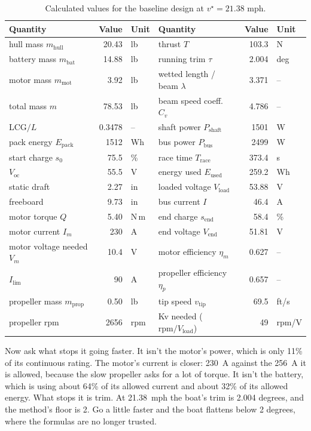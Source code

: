 \documentclass[11pt,a4paper]{article}
\renewcommand{\_}{\textunderscore\allowbreak}
\newcommand{\Trace}{T_{\mathrm{race}}}
\newcommand{\Pshaft}{P_{\mathrm{shaft}}}
\newcommand{\Pbus}{P_{\mathrm{bus}}}
\newcommand{\Eused}{E_{\mathrm{used}}}
\newcommand{\Epack}{E_{\mathrm{pack}}}
\newcommand{\Voc}{V_{\mathrm{oc}}}
\newcommand{\Vload}{V_{\mathrm{load}}}
\newcommand{\Vend}{V_{\mathrm{end}}}
\newcommand{\lcg}{\mathrm{LCG}}
\begin{document}
\begin{table}[H]
\centering\small
\caption{Calculated values for the baseline design at $v^\star=21.38$ mph.}
\begin{tabular}{@{}l r l @{\qquad} l r l@{}}
\toprule
Quantity & Value & Unit & Quantity & Value & Unit \\
\midrule
hull mass $m_{\mathrm{hull}}$ & 20.43 & lb & thrust $T$ & 103.3 & N \\
battery mass $m_{\mathrm{bat}}$ & 14.88 & lb & running trim $\tau$ & 2.004 & deg \\
motor mass $m_{\mathrm{mot}}$ & 3.92 & lb & wetted length / beam $\lambda$ & 3.371 & -- \\
total mass $m$ & 78.53 & lb & beam speed coeff.\ $C_v$ & 4.786 & -- \\
$\lcg/L$ & 0.3478 & -- & shaft power $\Pshaft$ & 1501 & W \\
pack energy $\Epack$ & 1512 & Wh & bus power $\Pbus$ & 2499 & W \\
start charge $s_0$ & 75.5 & \% & race time $\Trace$ & 373.4 & s \\
$\Voc$ & 55.5 & V & energy used $\Eused$ & 259.2 & Wh \\
static draft & 2.27 & in & loaded voltage $\Vload$ & 53.88 & V \\
freeboard & 9.73 & in & bus current $I$ & 46.4 & A \\
motor torque $Q$ & 5.40 & N\,m & end charge $s_{\mathrm{end}}$ & 58.4 & \% \\
motor current $I_m$ & 230 & A & end voltage $\Vend$ & 51.81 & V \\
motor voltage needed $V_m$ & 10.4 & V & motor efficiency $\eta_m$ & 0.627 & -- \\
$I_{\lim}$ & 90 & A & propeller efficiency $\eta_p$ & 0.657 & -- \\
propeller mass $m_{\mathrm{prop}}$ & 0.50 & lb & tip speed $v_{\mathrm{tip}}$ & 69.5 & ft/s \\
propeller rpm & 2656 & rpm & Kv needed ($\mathrm{rpm}/\Vload$) & 49 & rpm/V \\
\bottomrule
\end{tabular}
\end{table}

Now ask what stops it going faster. It isn't the motor's power, which is only 11\% of its continuous rating. The motor's current is closer: 230~A against the 256~A it is allowed, because the slow propeller asks for a lot of torque. It isn't the battery, which is using about 64\% of its allowed current and about 32\% of its allowed energy.
What stops it is trim. At 21.38~mph the boat's trim is 2.004 degrees, and the method's floor is 2. Go a little faster and the boat flattens below 2 degrees, where the formulas are no longer trusted.
\end{document}

